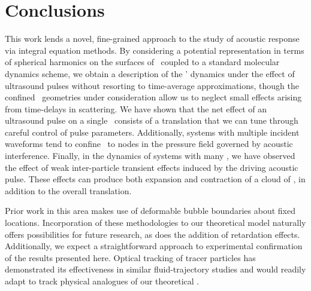 \section{Conclusions}

This work lends a novel, fine-grained approach to the study of acoustic response via integral equation methods.
By considering a potential representation in terms of spherical harmonics on the surfaces of \bubbles\ coupled to a standard molecular dynamics scheme, we obtain a description of the \bubbles' dynamics under the effect of ultrasound pulses without resorting to time-average approximations, though the confined \bubble\ geometries under consideration allow us to neglect small effects arising from time-delays in scattering.
We have shown that the net effect of an ultrasound pulse on a single \bubble\ consists of a translation that we can tune through careful control of pulse parameters.
Additionally, systems with multiple incident waveforms tend to confine \bubbles\ to nodes in the pressure field governed by acoustic interference.
Finally, in the dynamics of systems with many \bubbles, we have observed the effect of weak inter-particle transient effects induced by the driving acoustic pulse.
These effects can produce both expansion and contraction of a cloud of \bubbles, in addition to the overall translation.

Prior work in this area \cite{Zeravcic2011, Tiwari2015} makes use of deformable bubble boundaries about fixed locations. 
Incorporation of these methodologies to our theoretical model naturally offers possibilities for future research, as does the addition of retardation effects. 
Additionally, we expect a straightforward approach to experimental confirmation of the results presented here. 
Optical tracking of tracer particles\cite{Toschi2009} has demonstrated its effectiveness in similar fluid-trajectory studies and would readily adapt to track physical analogues of our theoretical \bubbles.
